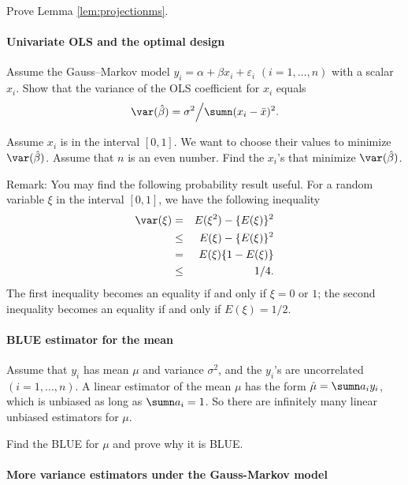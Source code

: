 Prove Lemma \ref{lem:projectionms}. 



\paragraph{Univariate OLS and the optimal design}
\label{hw::gaussmarkov-1d}

Assume the Gauss--Markov model $y_i = \alpha + \beta x_i + \varepsilon_i$ $(i=1,\ldots, n)$ with a scalar $x_i$. Show that the variance of the OLS coefficient for $x_i$ equals
$$
\var(  \hat{\beta} ) = \sigma^2 \Big / \sumn (x_i - \bar{x})^2 .
$$

Assume $x_i$ is in the interval $[0, 1]$. We want to choose their values to minimize $\var(  \hat{\beta} )$. Assume that $n$ is an even number. Find the $x_i$'s that minimize $\var(  \hat{\beta} ) $. 

Remark: You may find the following probability result useful. For a random variable $\xi$ in the interval $[0, 1]$, we have the following inequality
\begin{eqnarray*}
\var(\xi) &=& E(\xi^2) - \{ E(\xi) \}^2 \\
 &\leq & E(\xi) - \{ E(\xi) \}^2  \\
 &=& E(\xi)\{ 1 - E(\xi) \} \\
 &\leq & 1/4. 
\end{eqnarray*}
The first inequality becomes an equality if and only if $\xi=0$ or $1$; the second inequality becomes an equality if and only if $E(\xi) = 1/2.$



\paragraph{BLUE estimator for the mean}\label{hw04::blue-mean}

Assume that $y_i$ has mean $\mu$ and variance $\sigma^2$, and the $y_i$'s are uncorrelated $(i=1, \ldots, n)$. A linear estimator of the mean $\mu$ has the form $\hat{\mu} = \sumn a_i y_i$, which is unbiased as long as $ \sumn a_i = 1$. So there are infinitely many linear unbiased estimators for $\mu$. 

Find the BLUE for $\mu$ and prove why it is BLUE. 




\paragraph{More variance estimators under the Gauss-Markov model}\label{hw04::variance-estimation-A}


